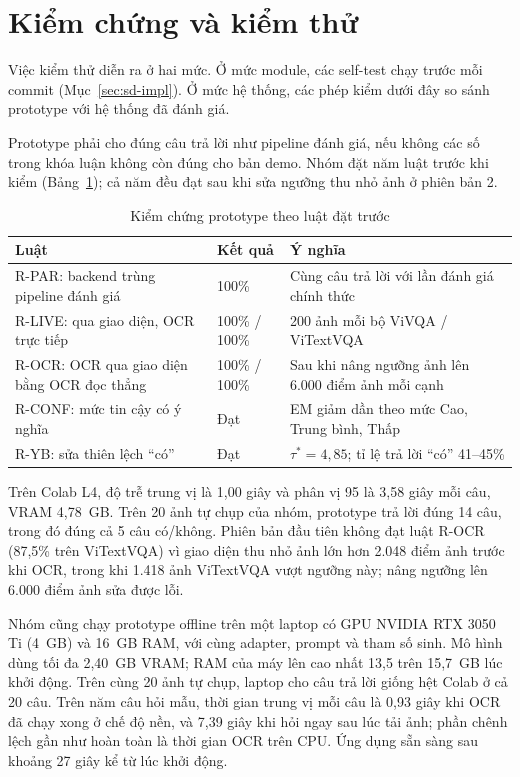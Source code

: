 \section{Kiểm chứng và kiểm thử}
\label{sec:res-proto}

Việc kiểm thử diễn ra ở hai mức. Ở mức module, các self-test chạy trước mỗi commit
(Mục~\ref{sec:sd-impl}). Ở mức hệ thống, các phép kiểm dưới đây so sánh prototype với hệ
thống đã đánh giá.

Prototype phải cho đúng câu trả lời như pipeline đánh giá, nếu không các số trong
khóa luận không còn đúng cho bản demo. Nhóm đặt năm luật trước khi kiểm
(Bảng~\ref{tab:res-proto}); cả năm đều đạt sau khi sửa ngưỡng thu nhỏ ảnh ở phiên
bản 2.

\begin{table}[htbp]
\caption{Kiểm chứng prototype theo luật đặt trước}
\label{tab:res-proto}
\centering
\small
\begin{tabular}{p{}p{}p{}}
\toprule
\raggedright \textbf{Luật} & \raggedright \textbf{Kết quả} & \raggedright \textbf{Ý nghĩa} \tabularnewline
\midrule
\raggedright R-PAR: backend trùng pipeline đánh giá & \raggedright 100\% & \raggedright Cùng câu trả lời với lần đánh giá chính thức \tabularnewline
\raggedright R-LIVE: qua giao diện, OCR trực tiếp & \raggedright 100\% / 100\% & \raggedright 200 ảnh mỗi bộ ViVQA / ViTextVQA \tabularnewline
\raggedright R-OCR: OCR qua giao diện bằng OCR đọc thẳng & \raggedright 100\% / 100\% & \raggedright Sau khi nâng ngưỡng ảnh lên 6.000 điểm ảnh mỗi cạnh \tabularnewline
\raggedright R-CONF: mức tin cậy có ý nghĩa & \raggedright Đạt & \raggedright EM giảm dần theo mức Cao, Trung bình, Thấp \tabularnewline
\raggedright R-YB: sửa thiên lệch ``có'' & \raggedright Đạt & \raggedright $\tau^* = 4{,}85$; tỉ lệ trả lời ``có'' 41--45\% \tabularnewline
\bottomrule
\end{tabular}
\end{table}

Trên Colab L4, độ trễ trung vị là 1,00 giây và phân vị 95 là 3,58 giây mỗi câu,
VRAM 4,78~GB. Trên 20 ảnh tự chụp của nhóm, prototype trả lời đúng 14 câu, trong đó
đúng cả 5 câu có/không. Phiên bản đầu tiên không đạt luật R-OCR (87,5\% trên
ViTextVQA) vì giao diện thu nhỏ ảnh lớn hơn 2.048 điểm ảnh trước khi OCR, trong khi
1.418 ảnh ViTextVQA vượt ngưỡng này; nâng ngưỡng lên 6.000 điểm ảnh sửa được lỗi.

Nhóm cũng chạy prototype offline trên một laptop có GPU NVIDIA RTX 3050 Ti (4~GB) và
16~GB RAM, với cùng adapter, prompt và tham số sinh. Mô hình dùng tối đa 2,40~GB VRAM;
RAM của máy lên cao nhất 13,5 trên 15,7~GB lúc khởi động. Trên cùng 20 ảnh tự chụp,
laptop cho câu trả lời giống hệt Colab ở cả 20 câu. Trên năm câu hỏi mẫu, thời gian
trung vị mỗi câu là 0,93 giây khi OCR đã chạy xong ở chế độ nền, và 7,39 giây khi hỏi
ngay sau lúc tải ảnh; phần chênh lệch gần như hoàn toàn là thời gian OCR trên CPU.
Ứng dụng sẵn sàng sau khoảng 27 giây kể từ lúc khởi động.


